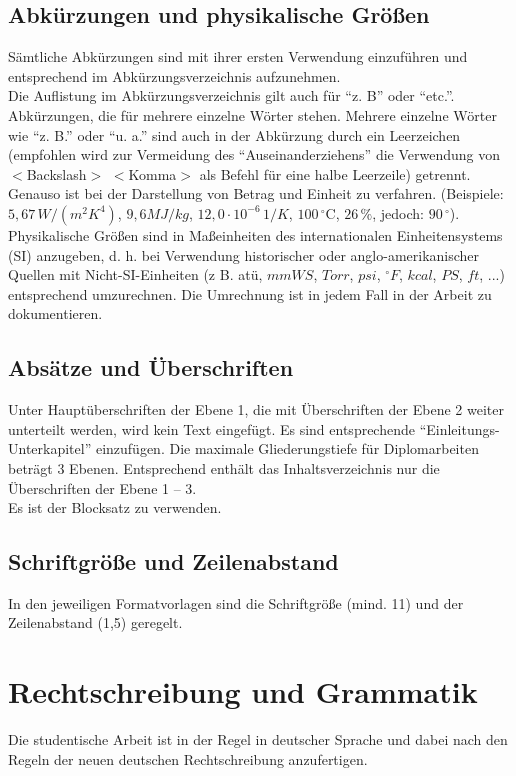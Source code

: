 \subsection{Abkürzungen und physikalische Größen}
Sämtliche Abkürzungen sind mit ihrer ersten Verwendung einzuführen und entsprechend im Abkürzungsverzeichnis aufzunehmen. \\
Die Auflistung im Abkürzungsverzeichnis gilt auch für ``z. B'' oder ``etc.''. Abkürzungen, die für mehrere einzelne Wörter stehen. Mehrere einzelne Wörter wie ``z. B.'' oder ``u. a.'' sind auch in der Abkürzung durch ein Leerzeichen (empfohlen wird zur Vermeidung des ``Auseinanderziehens'' die Verwendung von $<$Backslash$>$ $<$Komma$>$ als Befehl für eine halbe Leerzeile) getrennt.\\
Genauso ist bei der Darstellung von Betrag und Einheit zu verfahren. (Beispiele: $5,67\, W/(m^{2}K^{4})$, $9,6 MJ/kg$, $12,0 \cdot 10^{-6}\,1/K$, $100\,^{\circ}\mathrm{C}$, $26\,\%$, jedoch: $90\,^{\circ}$).\\
Physikalische Größen sind in Maßeinheiten des internationalen Einheitensystems (SI) anzugeben, d. h. bei Verwendung historischer oder anglo-amerikanischer Quellen mit Nicht-SI-Einheiten (z B. atü, $mmWS$, $Torr$, $psi$, $^{\circ}F$, $kcal$, $PS$, $ft$, ...) entsprechend umzurechnen. Die Umrechnung ist in jedem Fall in der Arbeit zu dokumentieren.

\subsection{Absätze und Überschriften}
Unter Hauptüberschriften der Ebene 1, die mit Überschriften der Ebene 2 weiter unterteilt werden, wird kein Text eingefügt. Es sind entsprechende ``Einleitungs-Unterkapitel'' einzufügen.
Die maximale Gliederungstiefe für Diplomarbeiten beträgt 3 Ebenen. Entsprechend enthält das Inhaltsverzeichnis nur die Überschriften der Ebene 1 – 3.\\
Es ist der Blocksatz zu verwenden.

\subsection{Schriftgröße und Zeilenabstand}
In den jeweiligen Formatvorlagen sind die Schriftgröße (mind. 11) und der Zeilenabstand (1,5) geregelt.

\section{Rechtschreibung und Grammatik}
Die studentische Arbeit ist in der Regel in deutscher Sprache und dabei nach den Regeln der neuen deutschen Rechtschreibung anzufertigen.

